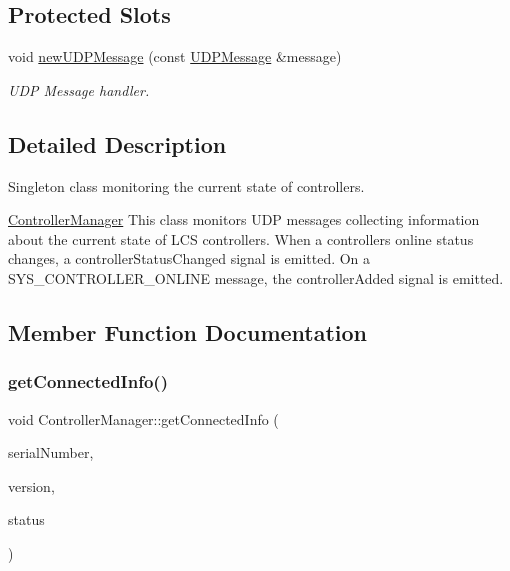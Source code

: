 \subsection*{Protected Slots}
\begin{DoxyCompactItemize}
\item 
\mbox{\label{class_controller_manager_a5e9480ad4b88ff536ab60dbc9cb6619f}} 
void \hyperlink{class_controller_manager_a5e9480ad4b88ff536ab60dbc9cb6619f}{new\+U\+D\+P\+Message} (const \hyperlink{class_u_d_p_message}{U\+D\+P\+Message} \&message)
\begin{DoxyCompactList}\small\item\em U\+DP Message handler. \end{DoxyCompactList}\end{DoxyCompactItemize}


\subsection{Detailed Description}
Singleton class monitoring the current state of controllers. 

\hyperlink{class_controller_manager}{Controller\+Manager} This class monitors U\+DP messages collecting information about the current state of L\+CS controllers. When a controller\textquotesingle{}s online status changes, a controller\+Status\+Changed signal is emitted. On a S\+Y\+S\+\_\+\+C\+O\+N\+T\+R\+O\+L\+L\+E\+R\+\_\+\+O\+N\+L\+I\+NE message, the controller\+Added signal is emitted. 

\subsection{Member Function Documentation}
\mbox{\label{class_controller_manager_a09aae80f5783ab2cb0da0ba39144ddf6}} 
\subsubsection{\texorpdfstring{get\+Connected\+Info()}{getConnectedInfo()}}
{\footnotesize\ttfamily void Controller\+Manager\+::get\+Connected\+Info (\begin{DoxyParamCaption}\item[{long}]{serial\+Number,  }\item[{Q\+String \&}]{version,  }\item[{\hyperlink{_global_defs_8h_a51207b6a49e0da6f9978a3019d93480a}{Controller\+Status\+Enum} \&}]{status }\end{DoxyParamCaption})}


